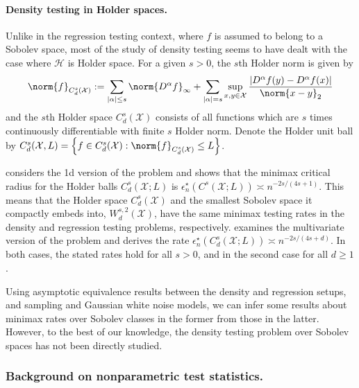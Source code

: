 \documentclass{article}
\newcommand{\abs}[1]{\left \lvert #1 \right \rvert}
\newcommand{\set}[1]{\left\{#1\right\}}
\newcommand{\1}{\mathbf{1}}
\theoremstyle{alden}
\theoremstyle{aldenthm}
\theoremstyle{definition}
\theoremstyle{remark}
\begin{document}
\paragraph{Density testing in Holder spaces.} Unlike in the regression testing context, where $f$ is assumed to belong to a Sobolev space, most of the study of density testing seems to have dealt with the case where $\mathcal{H}$ is Holder space. For a given $s > 0$, the $s$th Holder norm is given by
\begin{equation*}
\norm{f}_{C_d^{s}(\mathcal{X})} := \sum_{\abs{\alpha} \leq s} \norm{D^{\alpha}f}_{\infty} + \sum_{\abs{\alpha} = s} \sup_{x,y \in \mathcal{X}} \frac{\abs{D^{\alpha}f(y) - D^{\alpha}f(x)}}{\norm{x - y}_2}
\end{equation*}
and the $s$th Holder space $C_d^{s}(\mathcal{X})$ consists of all functions which are $s$ times continuously differentiable with finite $s$ Holder norm. Denote the Holder unit ball by $C_d^{s}(\mathcal{X},L) = \set{f \in C_d^{s}(\mathcal{X}): \norm{f}_{C_d^{s}(\mathcal{X})} \leq L}$.

\citet{ingster87} considers the 1d version of the problem and shows that the minimax critical radius for the Holder balls $C_d^{s}(\mathcal{X};L)$ is $\epsilon_n^{\star}(C^{s}(\mathcal{X};L)) \asymp n^{-2s/(4s + 1)}$. This means that the Holder space $C_d^{s}(\mathcal{X})$ and the smallest Sobolev space it compactly embeds into, $W_d^{s,2}(\mathcal{X})$, have the same minimax testing rates in the density and regression testing problems, respectively. \cite{ariascastro18} examines the multivariate version of the problem and derives the rate $\epsilon_n^{\star}(C_d^{s}(\mathcal{X};L)) \asymp n^{-2s/(4s + d)}$. In both cases, the stated rates hold for all $s > 0$, and in the second case for all $d \geq 1$. 

Using asymptotic equivalence results \citet{reiss08,nussbaum96,brown96} between the density and regression setups, and sampling and Gaussian white noise models, we can infer some results about minimax rates over Sobolev classes in the former from those in the latter. However, to the best of our knowledge, the density testing problem over Sobolev spaces has not been directly studied.

\subsubsection{Background on nonparametric test statistics.}
\end{document}
